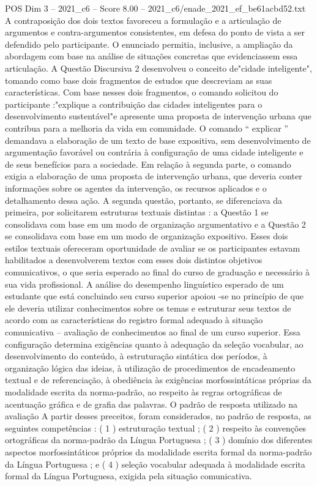 \begin{textsample}{POS Dim 3 – 2021\_c6 – Score 8.00 – 2021\_c6/enade\_2021\_ef\_be61acbd52.txt}
A contraposição dos dois textos favoreceu a formulação e a articulação de argumentos e contra-argumentos consistentes, em defesa do ponto de vista a ser defendido pelo participante.
O enunciado permitia, inclusive, a ampliação da abordagem com base na análise de situações concretas que evidenciassem essa articulação.
A Questão Discursiva 2 desenvolveu o conceito de"cidade inteligente", tomando como base dois fragmentos de estudos que descreviam as suas características.
Com base nesses dois fragmentos, o comando solicitou do participante :"explique a contribuição das cidades inteligentes para o desenvolvimento sustentável"e apresente uma proposta de intervenção urbana que contribua para a melhoria da vida em comunidade.
O comando “ explicar ” demandava a elaboração de um texto de base expositiva, sem desenvolvimento de argumentação favorável ou contrária à configuração de uma cidade inteligente e de seus benefícios para a sociedade.
Em relação à segunda parte, o comando exigia a elaboração de uma proposta de intervenção urbana, que deveria conter informações sobre os agentes da intervenção, os recursos aplicados e o detalhamento dessa ação.
A segunda questão, portanto, se diferenciava da primeira, por solicitarem estruturas textuais distintas : a Questão 1 se consolidava com base em um modo de organização argumentativo e a Questão 2 se consolidava com base em um modo de organização expositivo.
Esses dois estilos textuais ofereceram oportunidade de avaliar se os participantes estavam habilitados a desenvolverem textos com esses dois distintos objetivos comunicativos, o que seria esperado ao final do curso de graduação e necessário à sua vida profissional.
A análise do desempenho linguístico esperado de um estudante que está concluindo seu curso superior apoiou -se no princípio de que ele deveria utilizar conhecimentos sobre os temas e estruturar seus textos de acordo com as características do registro formal adequado à situação comunicativa – avaliação de conhecimentos ao final de um curso superior.
Essa configuração determina exigências quanto à adequação da seleção vocabular, ao desenvolvimento do conteúdo, à estruturação sintática dos períodos, à organização lógica das ideias, à utilização de procedimentos de encadeamento textual e de referenciação, à obediência às exigências morfossintáticas próprias da modalidade escrita da norma-padrão, ao respeito às regras ortográficas de acentuação gráfica e de grafia das palavras.
O padrão de resposta utilizado na avaliação A partir desses preceitos, foram considerados, no padrão de resposta, as seguintes competências : ( 1 ) estruturação textual ; ( 2 ) respeito às convenções ortográficas da norma-padrão da Língua Portuguesa ; ( 3 ) domínio dos diferentes aspectos morfossintáticos próprios da modalidade escrita formal da norma-padrão da Língua Portuguesa ; e ( 4 ) seleção vocabular adequada à modalidade escrita formal da Língua Portuguesa, exigida pela situação comunicativa.

\end{textsample}

